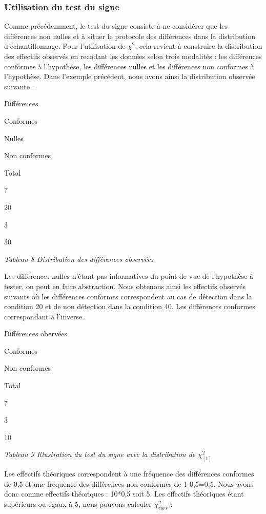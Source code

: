 \documentclass[]{book}
\theoremstyle{definition}
\theoremstyle{definition}
\theoremstyle{definition}
\theoremstyle{remark}
\begin{document}
\hypertarget{utilisation-du-test-du-signe}{%
\subsubsection{Utilisation du test du
signe}\label{utilisation-du-test-du-signe}}

Comme précédemment, le test du signe consiste à ne considérer que les
différences non nulles et à situer le protocole des différences dans la
distribution d'échantillonnage. Pour l'utilisation de \(\chi ^{2}\),
cela revient à construire la distribution des effectifs observés en
recodant les données selon trois modalités : les différences conformes à
l'hypothèse, les différences nulles et les différences non conformes à
l'hypothèse. Dans l'exemple précédent, nous avons ainsi la distribution
observée suivante :

Différences

Conformes

Nulles

Non conformes

Total

7

20

3

30

\emph{Tableau 8 Distribution des différences observées}

Les différences nulles n'étant pas informatives du point de vue de
l'hypothèse à tester, on peut en faire abstraction. Nous obtenons ainsi
les effectifs observés suivants où les différences conformes
correspondent au cas de détection dans la condition 20 et de non
détection dans la condition 40. Les différences conformes correspondant
à l'inverse.

Différences obervées

Conformes

Non conformes

Total

7

3

10

\emph{Tableau 9 Illustration du test du signe avec la distribution de}
\(\chi ^2_{[1]}\)

Les effectifs théoriques correspondent à une fréquence des différences
conformes de 0,5 et une fréquence des différences non conformes de
1-0,5=0,5. Nous avons donc comme effectifs théoriques : 10*0,5 soit 5.
Les effectifs théoriques étant supérieurs ou égaux à 5, nous pouvons
calculer \(\chi ^2_{corr}\) :
\end{document}
